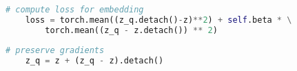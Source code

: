 \begin{lstlisting}[language=Python, label=lst:vqvae_loss, caption=Loss function as defined in the VQ-VAE paper (eq. \ref{eq:vq_loss}). The detach keyword is the stop gradient operation.]
    # compute loss for embedding
    loss = torch.mean((z_q.detach()-z)**2) + self.beta * \
        torch.mean((z_q - z.detach()) ** 2)
\end{lstlisting}



\begin{lstlisting}[language=Python, label=lst:vqvae_stop_gradients, caption=Allow gradients to flow through the snapping operation.]
    # preserve gradients
    z_q = z + (z_q - z).detach()
\end{lstlisting}